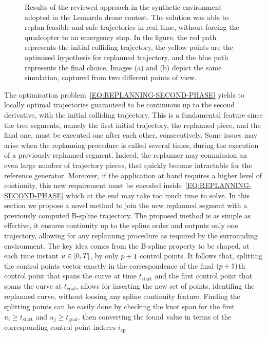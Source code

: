 \begin{figure}[!t]
\begin{center}
\begin{minipage}{.45\linewidth}
		\end{minipage}
	\end{center}
	\caption{Results of the reviewed approach in the synthetic environment adopted in the Leonardo drone contest.
    The solution was able to replan feasible and safe trajectories in real-time, without forcing the quadcopter to an emergency stop.
    In the figure, the red path represents the initial colliding trajectory, the yellow points are the optimised hypothesis for replanned
    trajectory, and the blue path represents the final choice. Images (a) and (b) depict the same simulation, captured from two different
    points of view.}%
    \label{FIG:REPLANNING-RESULTS-TRAJECTORY}
\end{figure}
The optimisation problem~\eqref{EQ:REPLANNING-SECOND-PHASE} yields to locally optimal trajectories guaranteed to be continuous up to
the second derivative, with the initial colliding trajectory. This is a fundamental feature since the tree segments, namely the first initial
trajectory, the replanned piece, and the final one, must be executed one after each other, consecutively.
Some issues may arise when the replanning procedure is called several times, during the execution of a previously replanned segment.
Indeed, the replanner may commission an even large number of trajectory pieces, that quickly become intractable for the reference generator.
Moreover, if the application at hand requires a higher level of continuity, this new requirement must be encoded inside~\eqref{EQ:REPLANNING-SECOND-PHASE}
which at the end may take too much time to solve.
In this section we propose a novel method to join the new replanned segment with a previously computed B-spline trajectory.
The proposed method is as simple as effective, it ensures continuity up to the spline order and outputs only one trajectory,
allowing for any replanning procedure as required by the surrounding environment.
The key idea comes from the B-spline property to be shaped, at each time instant $u \in \left[ 0, T \right]$, by only $p+1$
control points. It follows that, splitting the control points vector exactly in the correspondence of the final $(p+1)$th control point
that spans the curve at time $t_{\text{start}}$ and the first control point that spans the curve at $t_{\text{goal}}$, allows for
inserting the new set of points, identifing the replanned curve, without loosing any spline continuity feature.
Finding the splitting points can be easily done by checking the knot span for the first $u_i \ge t_{\text{start}}$ and 
$u_j \ge t_{\text{goal}}$, then converting the found value in terms of the corresponding control point indeces $i_{\text{cp}}$
